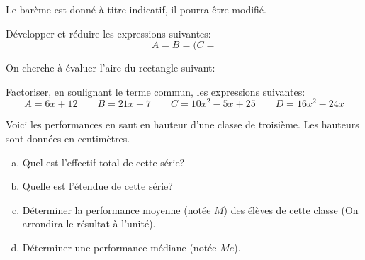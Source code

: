 \documentclass[a4paper,10pt]{/media/documents/Cours/Prof/Enseignements/tools/style/classDS}
\date{26 septemble 2013}
\begin{document}
\maketitle

\Calc
Le barème est donné à titre indicatif, il pourra être modifié.

\begin{Exo}[4.5]
		Développer et réduire les expressions suivantes:
		\begin{equation*}
				A = %
				B = (%
				C = %
		\end{equation*}
\end{Exo}

\begin{Exo}[4]
			On cherche à évaluer l'aire du rectangle suivant:
			\begin{center}
			\end{center}
\end{Exo}

\begin{Exo}[6]
		Factoriser, en soulignant le terme commun, les expressions suivantes:
		\begin{equation*}
				A = 6x + 12 \qquad B = 21x + 7 \qquad C = 10x^2 - 5x + 25 \qquad D = 16x^2 - 24x
		\end{equation*}
\end{Exo}

\begin{Exo}[5.5]
		Voici les performances en saut en hauteur d'une classe de troisième. Les hauteurs sont données en centimètres.
		\begin{equation*}
		\end{equation*}
		\begin{enumerate}[a.]
				\item Quel est l'effectif total de cette série?
				\item Quelle est l'étendue de cette série?
				\item Déterminer la performance moyenne (notée $M$) des élèves de cette classe (On arrondira le résultat à l'unité).
				\item Déterminer une performance médiane (notée $Me$).
		\end{enumerate}

\end{Exo}
\end{document}
